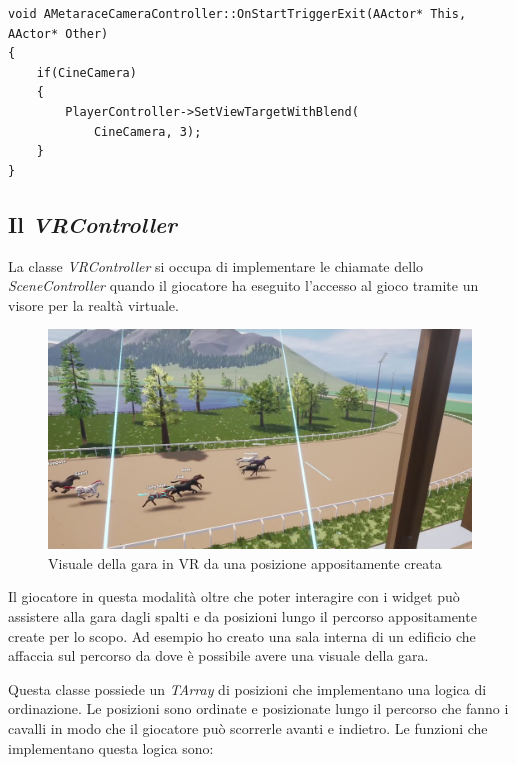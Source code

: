    \begin{lstlisting}[caption = Funzione per impostare la telecamera per la vista dell'utente]
void AMetaraceCameraController::OnStartTriggerExit(AActor* This, AActor* Other)
{
    if(CineCamera)
    {
        PlayerController->SetViewTargetWithBlend(
            CineCamera, 3); 
    }
}
    \end{lstlisting}

    \subsection{Il \textit{VRController}}

    La classe \textit{VRController} si occupa di implementare le chiamate dello \textit{SceneController} quando il giocatore ha eseguito l'accesso al gioco tramite un visore per la realtà virtuale.

    \begin{figure}[!ht]
        \centering
        \includegraphics[width=12cm]{figure/VRVisuale.png}
        \caption{Visuale della gara in VR da una posizione appositamente creata}
    \end{figure}

    Il giocatore in questa modalità oltre che poter interagire con i widget può assistere alla gara dagli spalti e da posizioni lungo il percorso appositamente create per lo scopo.
    Ad esempio ho creato una sala interna di un edificio che affaccia sul percorso da dove è possibile avere una visuale della gara.

    Questa classe possiede un \textit{TArray} di posizioni che implementano una logica di ordinazione.
    Le posizioni sono ordinate e posizionate lungo il percorso che fanno i cavalli in modo che il giocatore può scorrerle avanti e indietro.
    Le funzioni che implementano questa logica sono:
    
